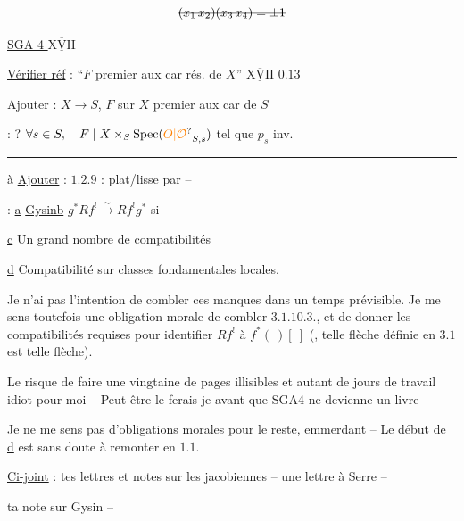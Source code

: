 \[
\deleted{(x_1\,x_2)(x_3\,x_4)=\pm1}
\]


\uline{SGA 4 $\underline{\overline{\mathrm{XVII}}}$}

\uline{Vérifier réf} : ``$F$ premier aux car rés. de $X$''
\quad $\underline{\overline{\mathrm{XVII}}}$ $0.13$

Ajouter : $X\longrightarrow S$, \quad $F$ sur $X$ premier aux car de  $S$

: ? $\forall s\in S,\quad F\mid X\times_S\mathrm{Spec}(\unsure{O|\mathcal O}_{S,s})$ tel que $p_s$ inv.

\smallskip\hfil\rule{.10\linewidth}{.35pt}\hfil

à \uline{Ajouter} : $1.2.9$ : plat/lisse par  --



 : \uline{a} \uline{Gysin}\qquad \uline{b} $g^*Rf^!\xrightarrow{\sim}Rf^!g^*$ si \mbox{-\,-\,-}

\uline{c} Un grand nombre de compatibilités 

\uline{d} Compatibilité sur classes fondamentales locales.

Je n'ai pas l'intention de combler ces manques dans un
temps prévisible. Je me sens toutefois une obligation morale
\margin{$\left[\vphantom{\rule{0pt}{5\baselineskip}}\right.$}de combler $3.1.10.3$., et de donner les compatibilités requises
pour identifier $Rf^!$ à $f^*(\ )[\ ]$ (, telle flèche définie en $3.1$ est telle flèche).

Le risque de faire une vingtaine de pages illisibles et autant de
jours de travail idiot pour moi -- Peut-être le ferais-je avant
que SGA4 ne devienne un livre --

Je ne me sens pas d'obligations morales pour le reste, 
emmerdant -- Le début de \uline{d} est sans doute à remonter en $1.1$.

\uline{Ci-joint} : tes lettres et notes sur les jacobiennes -- une lettre à Serre --

ta note sur Gysin --

